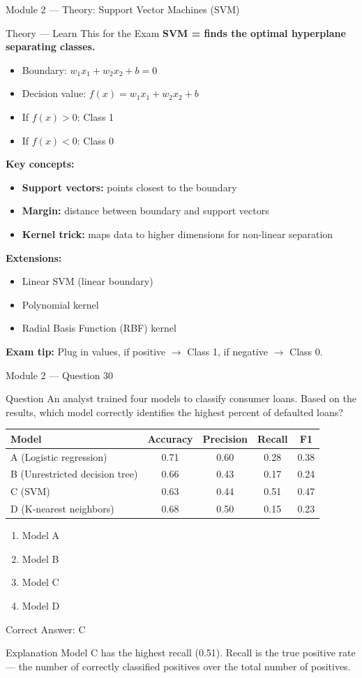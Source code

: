 \documentclass[aspectratio=169,10pt]{beamer}
\newcommand{\question}[1]{%
	\begin{block}{Question}
		#1
	\end{block}
}
\newcommand{\options}[4]{%
	\begin{enumerate}[label=\Alph*.,leftmargin=*]
		\item #1
		\item #2
		\item #3
		\item #4
	\end{enumerate}
}
\newcommand{\answerbox}[1]{%
	\begin{exampleblock}{Correct Answer: #1}
	\end{exampleblock}
}
\newcommand{\explain}[1]{%
	\begin{block}{Explanation}
		\small #1
	\end{block}
}
\newcommand{\theory}[1]{%
	\begin{block}{Theory --- Learn This for the Exam}
		\small #1
	\end{block}
}
\begin{document}
	\begin{frame}{Module 2 --- Theory: Support Vector Machines (SVM)}
		\theory{
			\textbf{SVM = finds the optimal hyperplane separating classes.}
			\begin{itemize}
				\item Boundary: $w_1x_1 + w_2x_2 + b = 0$
				\item Decision value: $f(x) = w_1x_1 + w_2x_2 + b$
				\item If $f(x) > 0$: Class 1
				\item If $f(x) < 0$: Class 0
			\end{itemize}
			\textbf{Key concepts:}
			\begin{itemize}
				\item \textbf{Support vectors:} points closest to the boundary
				\item \textbf{Margin:} distance between boundary and support vectors
				\item \textbf{Kernel trick:} maps data to higher dimensions for non-linear separation
			\end{itemize}
			\textbf{Extensions:}
			\begin{itemize}
				\item Linear SVM (linear boundary)
				\item Polynomial kernel
				\item Radial Basis Function (RBF) kernel
			\end{itemize}
			\textbf{Exam tip:} Plug in values, if positive $\rightarrow$ Class 1, if negative $\rightarrow$ Class 0.
		}
	\end{frame}
	
	\begin{frame}{Module 2 --- Question 30}
		\question{An analyst trained four models to classify consumer loans. Based on the results, which model correctly identifies the highest percent of defaulted loans?}
		\begin{center}
			\small
			\begin{tabular}{@{}lcccc@{}}
				\toprule
				Model & Accuracy & Precision & Recall & F1 \\
				\midrule
				A (Logistic regression) & 0.71 & 0.60 & 0.28 & 0.38 \\
				B (Unrestricted decision tree) & 0.66 & 0.43 & 0.17 & 0.24 \\
				C (SVM) & 0.63 & 0.44 & 0.51 & 0.47 \\
				D (K-nearest neighbors) & 0.68 & 0.50 & 0.15 & 0.23 \\
				\bottomrule
			\end{tabular}
		\end{center}
		\options{Model A}{Model B}{Model C}{Model D}
		\answerbox{C}
		\explain{Model C has the highest recall (0.51). Recall is the true positive rate --- the number of correctly classified positives over the total number of positives.}
	\end{frame}
	
\end{document}
